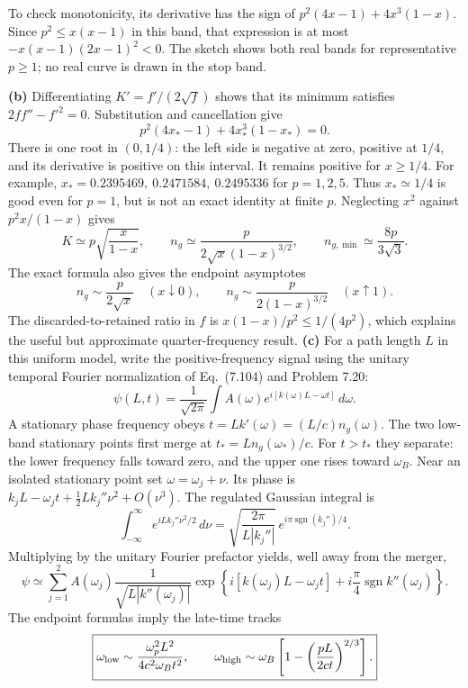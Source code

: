 To check monotonicity, its derivative has the sign of
$p^2(4x-1)+4x^3(1-x)$. Since $p^2\leq x(x-1)$ in this band,
that expression is at most
$-x(x-1)(2x-1)^2<0$.
The sketch shows both real bands for representative $p\geq1$;
no real curve is drawn in the stop band.
\begin{center}

\end{center}
\textbf{(b)} Differentiating $K'=f'/(2\sqrt f)$ shows that its
minimum satisfies $2ff''-f'^2=0$. Substitution and cancellation give
\[
\boxed{p^2(4x_*-1)+4x_*^3(1-x_*)=0.}
\]
There is one root in $(0,1/4)$: the left side is negative at zero,
positive at $1/4$, and its derivative is positive on this interval.
It remains positive for $x\geq1/4$. For example,
$x_*=0.2395469,\ 0.2471584,\ 0.2495336$ for $p=1,2,5$.
Thus $x_*\simeq1/4$ is good even for $p=1$, but is not an exact
identity at finite $p$.
Neglecting $x^2$ against $p^2x/(1-x)$ gives
\[
K\simeq p\sqrt{\frac{x}{1-x}},\qquad
n_g\simeq\frac{p}{2\sqrt{x}(1-x)^{3/2}},\qquad
n_{g,\min}\simeq\frac{8p}{3\sqrt3}.
\]
The exact formula also gives the endpoint asymptotes
\[
\boxed{n_g\sim\frac{p}{2\sqrt x}\quad(x\downarrow0),\qquad
n_g\sim\frac{p}{2(1-x)^{3/2}}\quad(x\uparrow1).}
\]
The discarded-to-retained ratio in $f$ is
$x(1-x)/p^2\leq1/(4p^2)$, which explains the useful but approximate
quarter-frequency result.
\textbf{(c)} For a path length $L$ in this uniform model, write the
positive-frequency signal using the unitary temporal Fourier
normalization of Eq.~(7.104) and Problem 7.20:
\[
\psi(L,t)=\frac1{\sqrt{2\pi}}
\int A(\omega)e^{i[k(\omega)L-\omega t]}\,d\omega.
\]
A stationary phase frequency obeys
$t=Lk'(\omega)=(L/c)n_g(\omega)$.
The two low-band stationary points first merge at
$t_*=Ln_g(\omega_*)/c$. For $t>t_*$ they separate: the lower
frequency falls toward zero, and the upper one rises toward
$\omega_B$.  Near an isolated stationary point set
$\omega=\omega_j+\nu$.  Its phase is
$k_jL-\omega_jt+\tfrac12Lk_j''\nu^2+O(\nu^3)$.
The regulated Gaussian integral is
\[
\int_{-\infty}^{\infty}e^{iLk_j''\nu^2/2}\,d\nu
=\sqrt{\frac{2\pi}{L|k_j''|}}\,
e^{i\pi\operatorname{sgn}(k_j'')/4}.
\]
Multiplying by the unitary Fourier prefactor yields, well away
from the merger,
\[
\psi\simeq\sum_{j=1}^2 A(\omega_j)
\frac1{\sqrt{L|k''(\omega_j)|}}
\exp\left\{i[k(\omega_j)L-\omega_j t]
+i\frac\pi4\operatorname{sgn}k''(\omega_j)\right\}.
\]
The endpoint formulas imply the late-time tracks
\[
\boxed{\omega_{\rm low}\sim
\frac{\omega_p^2L^2}{4c^2\omega_Bt^2},\qquad
\omega_{\rm high}\sim\omega_B
\left[1-\left(\frac{pL}{2ct}\right)^{2/3}\right].}
\]
